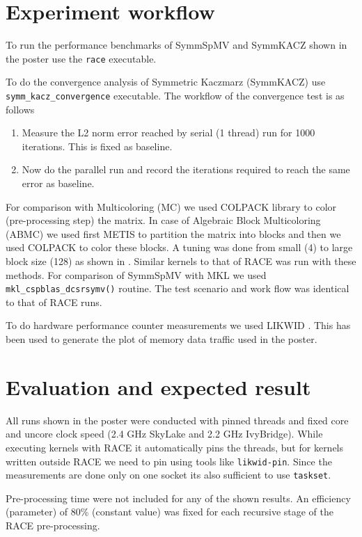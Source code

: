 	\section{Experiment workflow}
	To run the performance benchmarks of SymmSpMV and SymmKACZ shown in the poster use the \texttt{race} executable.
	
	To do the convergence analysis of Symmetric Kaczmarz (SymmKACZ) use  \texttt{symm\_kacz\_convergence} executable. The workflow of the convergence test is as follows
	
	\begin{enumerate}
		\item Measure the L2 norm error reached by serial (1 thread) run for 1000 iterations. This is fixed as baseline.
		\item Now do the parallel run and record the iterations required to reach the same error as baseline.
	\end{enumerate}
	
	For comparison with Multicoloring (MC) we used COLPACK \cite{COLPACK} library to color (pre-processing step) the matrix. In case of Algebraic Block Multicoloring (ABMC) we used first METIS \cite{METIS} to partition the matrix into blocks and then we used COLPACK to color these blocks. A tuning was done from small (4) to large block size (128) as shown in \cite{ABMC}. Similar kernels to that of RACE was run with these methods. For comparison of SymmSpMV with MKL\cite{MKL} we used \texttt{mkl\_cspblas\_dcsrsymv()} routine. The test scenario and work flow was identical to that of RACE runs.

	
	To do hardware performance counter measurements we used LIKWID \cite{LIKWID}. This has been used to generate the plot of memory data traffic used in the poster.  
	
	\section{Evaluation and expected result}
	All runs shown in the poster were conducted with pinned threads and fixed core and uncore clock speed (2.4 GHz SkyLake and 2.2 GHz IvyBridge). While executing kernels with RACE it automatically pins the threads, but for kernels written outside RACE we need to pin using tools like \texttt{likwid-pin}. Since the measurements are done only on one socket its also sufficient to use \texttt{taskset}. 
	
	Pre-processing time were not included for any of the shown results. An efficiency (parameter) of 80\% (constant value) was fixed for each recursive stage of the RACE pre-processing.
	
